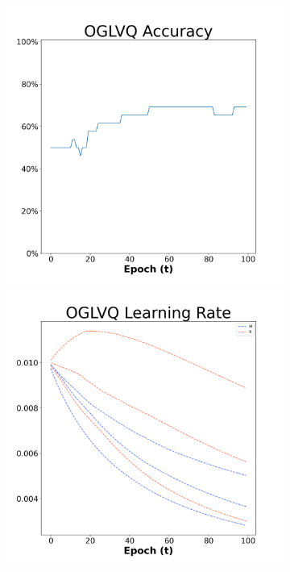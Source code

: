 \begin{figure}[H]
    \centering %
\begin{subfigure}{0.3\textwidth}
  \includegraphics[width=\linewidth]{images/exper1/Sonar/OGLVQ_0.01_acc.png}
    \includegraphics[width=\linewidth]{images/exper1/Sonar/OGLVQ_0.01_lr.png}

\end{subfigure}
\end{figure}
